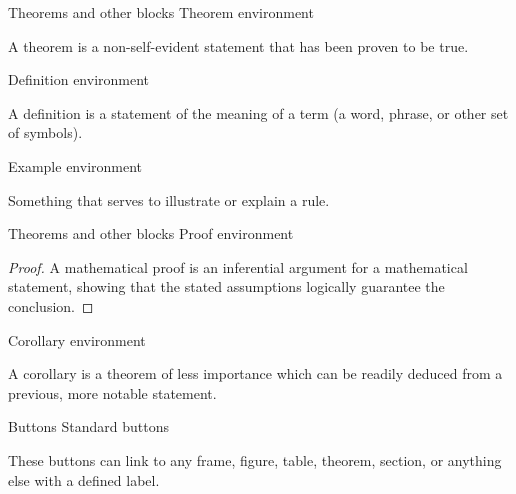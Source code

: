 \documentclass[10pt,t]{beamer}
\begin{document}
\begin{frame}{Theorems and other blocks}
Theorem environment
	\begin{theorem}
	A theorem is a non-self-evident statement that has been proven to be true.
	\end{theorem}

\vspace{11pt}
Definition environment
	\begin{definition}
	A definition is a statement of the meaning of a term (a word, phrase, or other set of symbols).
	\end{definition}

\vspace{11pt}	
Example environment
	\begin{example}
	Something that serves to illustrate or explain a rule.
	\end{example}
\end{frame}




\begin{frame}{Theorems and other blocks}
Proof environment
	\begin{proof}
	A mathematical proof is an inferential argument for a mathematical statement, showing that the stated assumptions logically guarantee the conclusion.
	\end{proof}
	
\vspace{11pt}	
Corollary environment
	\begin{corollary}
	A corollary is a theorem of less importance which can be readily deduced from a previous, more notable statement.
	\end{corollary}

\end{frame}






\begin{frame}{Buttons}
Standard buttons

	\hyperlink{colorpalette}{}


	\hyperlink{colorpalette}{\beamerreturnbutton{}}

\vspace{11pt}
These buttons can link to any frame, figure, table, theorem, section, or anything else with a defined label.
\end{frame}
\end{document}
